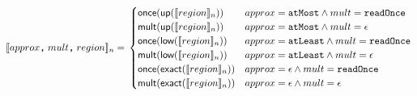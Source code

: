 \begin{dmath*}
\interp{approx\texttt{,} \; mult\texttt{,} \; region}_n = \\
   \begin{cases}
     \textsf{once}(\textsf{up}(\interp{region}_n)) &approx = \texttt{atMost} \wedge mult = \texttt{readOnce}\\
     \textsf{mult}(\textsf{up}(\interp{region}_n)) &approx = \texttt{atMost} \wedge mult = \epsilon\\
     \textsf{once}(\textsf{low}(\interp{region}_n)) &approx = \texttt{atLeast} \wedge mult = \texttt{readOnce}\\
     \textsf{mult}(\textsf{low}(\interp{region}_n)) &approx = \texttt{atLeast} \wedge mult = \epsilon \\
     \textsf{once}(\textsf{exact}(\interp{region}_n)) &approx = \epsilon \wedge mult = \texttt{readOnce}\\
     \textsf{mult}(\textsf{exact}(\interp{region}_n)) &approx = \epsilon \wedge mult = \epsilon
   \end{cases}
\end{dmath*}

